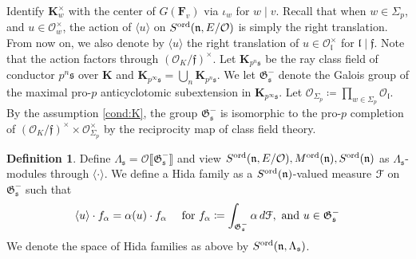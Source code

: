 \documentclass[leqno]{amsart}
\newcommand{\euF}{\EuScript{F}} %
\newcommand{\fG}{\mathfrak{G}}
\newcommand{\ord}{\textnormal{ord}}
\newcommand{\F}{{\mathbf{F}}} %
\newcommand{\K}{{\mathbf{K}}} %
\newcommand{\oo}{\mathcal{O}} %
\newcommand{\fs}{\mathfrak{s}}
\newcommand{\fn}{\mathfrak{n}}
\newcommand{\fl}{\mathfrak{l}}
\newcommand{\ff}{\mathfrak{f}}
\theoremstyle{definition}
\newtheorem{defn}[thm]{Definition}
\theoremstyle{remark}
\begin{document}
Identify $\K_w^\times$
with the center of $G(\F_v)$ 
via $\iota_w$ for  $w\mid v$.
Recall that when $w\in \Sigma_p$,
and  $u\in \oo_w^\times$,
the action of  $\langle u\rangle$
on  $S^{\ord}(\fn,E/\oo)$
is simply the right translation.
From now on, we also 
denote by $\langle u\rangle$
the right translation of $u\in \oo_{\fl}^{\times}$
for $\fl\mid \ff$.
Note that the action factors through $(\oo_K/\ff)^\times$.
Let $\K_{p^n\fs}$ be the ray class field of conductor 
$p^n\fs$ over $\K$ and 
$\K_{p^\infty\fs}=\bigcup_{n}\K_{p^n\fs}$.
We let $\fG_{\fs}^-$ denote
the Galois group of the maximal pro-$p$ anticyclotomic
subextension in $\K_{p^\infty\fs}$.
Let $\oo_{\Sigma_p}\coloneqq \prod_{w\in \Sigma_p}\oo_\fl$.
By the assumption \eqref{cond:K},
the group $\fG_{\fs}^-$
is isomorphic to the pro-$p$ completion
of $(\oo_K/\ff)^\times\times \oo_{\Sigma_p}^\times$ 
by the reciprocity map of class field theory.

\begin{defn}
Define $\Lambda_{\fs}=\oo\llbracket \fG_{\fs}^{-}\rrbracket$
and view $S^{\ord}(\fn,E/\oo), M^{\ord}(\fn), S^{\ord}(\fn)$
as $\Lambda_{\fs}$-modules through $\langle\cdot\rangle$.
We define a Hida family as a 
$S^{\ord}(\fn)$-valued measure $\euF$ on $\fG_{\fs}^-$
such that 
\[
	\langle u\rangle \cdot f_\alpha=
	\alpha(u)\cdot f_\alpha \quad\text{ for }
	f_\alpha\coloneqq \int_{\fG_{\fs}^-}\alpha\,d\euF,
	\text{ and } u\in \fG_{\fs}^-
\]
We denote the space of Hida families as above
by $S^{\ord}(\fn,\Lambda_{\fs})$.
\end{defn}
\end{document}

